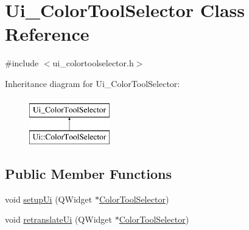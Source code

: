 \hypertarget{class_ui___color_tool_selector}{}\section{Ui\+\_\+\+Color\+Tool\+Selector Class Reference}
\label{class_ui___color_tool_selector}


{\ttfamily \#include $<$ui\+\_\+colortoolselector.\+h$>$}

Inheritance diagram for Ui\+\_\+\+Color\+Tool\+Selector\+:\begin{figure}[H]
\begin{center}
\leavevmode
\includegraphics[height=2.000000cm]{class_ui___color_tool_selector}
\end{center}
\end{figure}
\subsection*{Public Member Functions}
\begin{DoxyCompactItemize}
\item 
void \hyperlink{class_ui___color_tool_selector_aa302dcf865058c72705f5cf9a3e07822}{setup\+Ui} (Q\+Widget $\ast$\hyperlink{class_color_tool_selector}{Color\+Tool\+Selector})
\item 
void \hyperlink{class_ui___color_tool_selector_ac18c0e3964ab075c31dbe5708e5bfa15}{retranslate\+Ui} (Q\+Widget $\ast$\hyperlink{class_color_tool_selector}{Color\+Tool\+Selector})
\end{DoxyCompactItemize}
